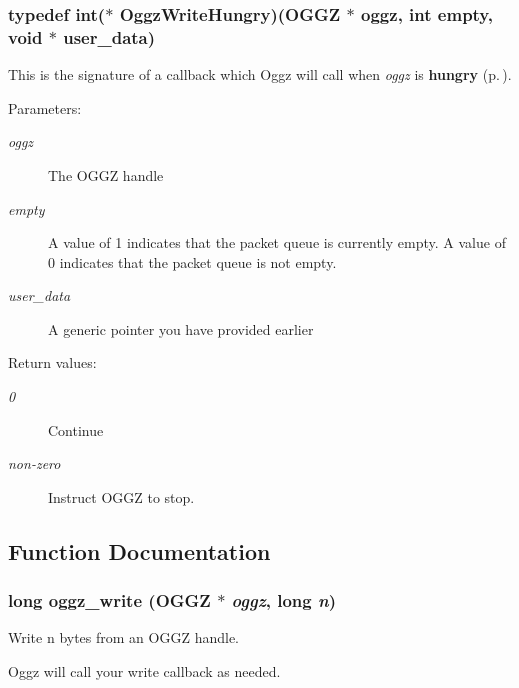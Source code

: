 \subsubsection{\setlength{\rightskip}{0pt plus 5cm}typedef int($\ast$ {\bf Oggz\-Write\-Hungry})({\bf OGGZ} $\ast$ oggz, int empty, void $\ast$ user\_\-data)}\label{group__write__api_a0}


This is the signature of a callback which Oggz will call when {\em oggz\/} is {\bf hungry }{\rm (p.\,\pageref{group__hungry})}. 

\begin{Desc}
\item[Parameters:]
\begin{description}
\item[{\em oggz}]The OGGZ handle \item[{\em empty}]A value of 1 indicates that the packet queue is currently empty. A value of 0 indicates that the packet queue is not empty. \item[{\em user\_\-data}]A generic pointer you have provided earlier \end{description}
\end{Desc}
\begin{Desc}
\item[Return values:]
\begin{description}
\item[{\em 0}]Continue \item[{\em non-zero}]Instruct OGGZ to stop. \end{description}
\end{Desc}


\subsection{Function Documentation}
\subsubsection{\setlength{\rightskip}{0pt plus 5cm}long oggz\_\-write ({\bf OGGZ} $\ast$ {\em oggz}, long {\em n})}\label{group__write__api_a4}


Write n bytes from an OGGZ handle. 

Oggz will call your write callback as needed.

